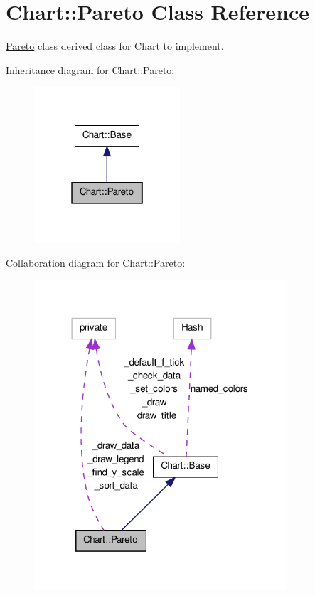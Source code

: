 \hypertarget{classChart_1_1Pareto}{
\section{Chart::Pareto Class Reference}
\label{classChart_1_1Pareto}
}


\hyperlink{classChart_1_1Pareto}{Pareto} class derived class for Chart to implement.  




Inheritance diagram for Chart::Pareto:\nopagebreak
\begin{figure}[H]
\begin{center}
\leavevmode
\includegraphics[width=154pt]{classChart_1_1Pareto__inherit__graph}
\end{center}
\end{figure}


Collaboration diagram for Chart::Pareto:\nopagebreak
\begin{figure}[H]
\begin{center}
\leavevmode
\includegraphics[width=266pt]{classChart_1_1Pareto__coll__graph}
\end{center}
\end{figure}
